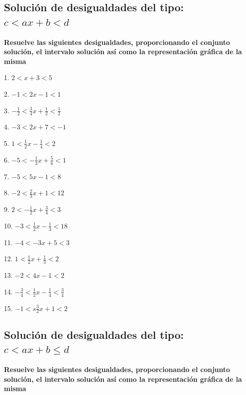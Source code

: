 \documentclass[]{book}
\begin{document}
\subsection{\texorpdfstring{Solución de desigualdades del tipo:
\(c< ax+b <d\)}{Solución de desigualdades del tipo: c\textless{} ax+b \textless{}d}}\label{soluciuxf3n-de-desigualdades-del-tipo-c-axb-d}

\textbf{Resuelve las siguientes desigualdades, proporcionando el
conjunto solución, el intervalo solución así como la representación
gráfica de la misma}

\begin{multicols}{3}
1. $2<x+3<5$

2. $-1<2x-1<1$

3. $-\frac{1}{2}<\frac{3}{4}x+\frac{1}{2}<\frac{1}{2}$

4. $-3< 2x+7<-1$

5. $1<\frac{1}{2}x-\frac{1}{4}<2$

6. $-5<-\frac{1}{3}x+\frac{5}{6}<1$

7. $-5<5x-1<8$

8. $-2< \frac{2}{3}x+1<12$

9. $2<-\frac{1}{2}x+\frac{3}{4}<3$

10. $-3< \frac{1}{2}x-\frac{1}{3}<18$

11. $-4< -3x+5<3$

12. $1<\frac{1}{2}x+\frac{1}{3}<2$

13. $-2< 4x-1<2$

14. $-\frac{3}{4}<\frac{1}{2}x-\frac{1}{4}<\frac{3}{4}$

15. $-1<s\frac{3}{2}x+1<2$
\end{multicols}

\subsection{\texorpdfstring{Solución de desigualdades del tipo:
\(c< ax+b \leq d\)}{Solución de desigualdades del tipo: c\textless{} ax+b \textbackslash{}leq d}}\label{soluciuxf3n-de-desigualdades-del-tipo-c-axb-leq-d}

\textbf{Resuelve las siguientes desigualdades, proporcionando el
conjunto solución, el intervalo solución así como la representación
gráfica de la misma}
\end{document}
